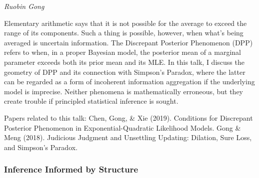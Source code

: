 \begin{itemize}
\emph{\footnotesize Ruobin Gong}

Elementary arithmetic says that it is not possible for the average to exceed the range of its components. Such a thing is possible, however, when what's being averaged is uncertain information. The Discrepant Posterior Phenomenon (DPP) refers to when, in a proper Bayesian model, the posterior mean of a marginal parameter exceeds both its prior mean and its MLE.  In this talk, I discuss the geometry of DPP and its connection with Simpson’s Paradox, where the latter can be regarded as a form of incoherent information aggregation if the underlying model is imprecise. Neither phenomena is mathematically erroneous, but they create trouble if principled statistical inference is sought.

Papers related to this talk:
Chen, Gong, \& Xie (2019). Conditions for Discrepant Posterior Phenomenon in Exponential-Quadratic Likelihood Models.
Gong \& Meng (2018). Judicious Judgment and Unsettling Updating: Dilation, Sure Loss, and Simpson’s Paradox.

\end{itemize}

\subsubsection*{Inference Informed by Structure}

